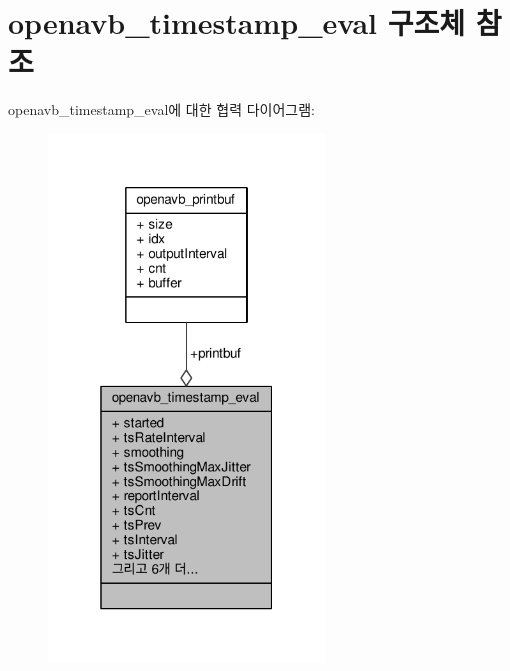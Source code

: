 \hypertarget{structopenavb__timestamp__eval}{}\section{openavb\+\_\+timestamp\+\_\+eval 구조체 참조}
\label{structopenavb__timestamp__eval}


openavb\+\_\+timestamp\+\_\+eval에 대한 협력 다이어그램\+:
\nopagebreak
\begin{figure}[H]
\begin{center}
\leavevmode
\includegraphics[width=208pt]{structopenavb__timestamp__eval__coll__graph}
\end{center}
\end{figure}
